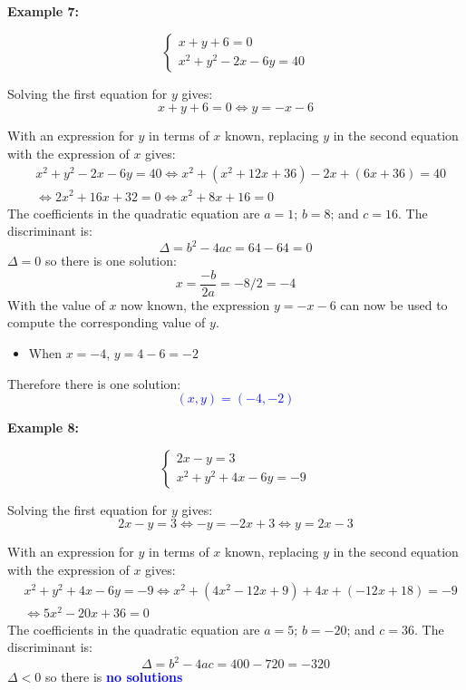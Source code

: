 \documentclass{article}
\newcommand{\dg}[1]{\textcolor{dark_green}{#1}}
\newcommand{\blue}[1]{\textcolor{blue}{#1}}
\begin{document}
\textbf{Example 7:}

\dg{\[\left\{\begin{array}{c}
x + y + 6 = 0 \\
x^2 + y^2 - 2x - 6y = 40
\end{array}\right.\]}

Solving the first equation for \(y\) gives:
\[x + y + 6 = 0 \iff y = -x - 6\]

With an expression for \(y\) in terms of \(x\) known, replacing \(y\) in the second equation with the expression of \(x\) gives:
\begin{align*}
& x^2 + y^2 - 2x - 6y = 40 
\iff x^2 + (x^2 + 12x + 36) - 2x + (6x + 36) = 40 \\
& \iff 2x^2 + 16x + 32 = 0 
\iff x^2 + 8x + 16 = 0 
\end{align*}
The coefficients in the quadratic equation are \(a = 1\); \(b = 8\); and \(c = 16\). The discriminant is:
\[\Delta = b^2 - 4ac = 64 - 64 = 0\]
\(\Delta = 0\) so there is one solution:
\[x = \frac{-b}{2a} = -8/2 = -4\]
With the value of \(x\) now known, the expression \(y = -x - 6\) can now be used to compute the corresponding value of \(y\).
\begin{itemize}
\item When \(x = -4\), \(y = 4 - 6 = -2\)
\end{itemize}
Therefore there is one solution:
\blue{\[(x,y) = (-4,-2)\]}




\textbf{Example 8:}

\dg{\[\left\{\begin{array}{c}
2x - y = 3 \\
x^2 + y^2 + 4x - 6y = -9
\end{array}\right.\]}

Solving the first equation for \(y\) gives:
\[2x - y = 3 \iff -y = -2x + 3 \iff y = 2x - 3\]

With an expression for \(y\) in terms of \(x\) known, replacing \(y\) in the second equation with the expression of \(x\) gives:
\begin{align*}
& x^2 + y^2 + 4x - 6y = -9  
\iff x^2 + (4x^2 - 12x + 9) + 4x + (-12x + 18) = -9 \\ 
& \iff 5x^2 - 20x + 36 = 0
\end{align*}
The coefficients in the quadratic equation are \(a = 5\); \(b = -20\); and \(c = 36\). The discriminant is:
\[\Delta = b^2 - 4ac = 400 - 720 = -320\]
\(\Delta < 0\) so there is \blue{\bf no solutions} \\
\end{document}
